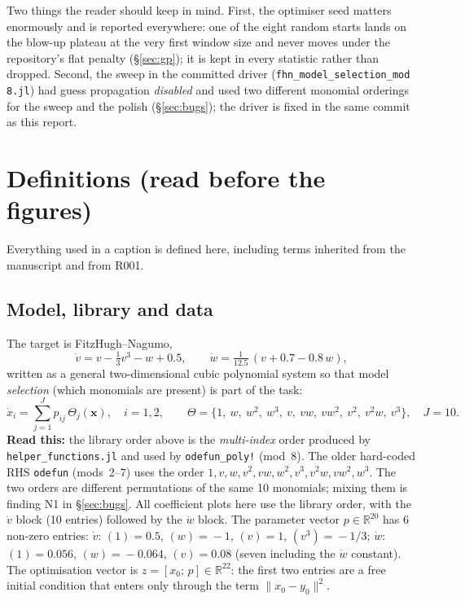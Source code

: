 \documentclass[10pt]{article}
\newcommand{\readthis}[1]{\textbf{Read this:} #1}
\begin{document}
Two things the reader should keep in mind. First, the optimiser seed matters enormously and is reported everywhere: one of the eight random starts lands on the blow-up plateau at the very first window size and never moves under the repository's flat penalty (\S\ref{sec:gp}); it is kept in every statistic rather than dropped. Second, the sweep in the committed driver (\texttt{fhn\_model\_selection\_mod 8.jl}) had guess propagation \emph{disabled} and used two different monomial orderings for the sweep and the polish (\S\ref{sec:bugs}); the driver is fixed in the same commit as this report.

\section{Definitions (read before the figures)}\label{sec:defs}
Everything used in a caption is defined here, including terms inherited from the manuscript and from R001.

\subsection{Model, library and data}
The target is FitzHugh--Nagumo,
\begin{equation}
\dot v = v - \tfrac{1}{3}v^3 - w + 0.5,\qquad \dot w = \tfrac{1}{12.5}\,(v + 0.7 - 0.8\,w),
\end{equation}
written as a general two-dimensional cubic polynomial system so that model \emph{selection} (which monomials are present) is part of the task:
\begin{equation}
\dot x_i = \sum_{j=1}^{J} p_{ij}\,\Theta_j(\mathbf x),\quad i=1,2,\qquad
\Theta = \{1,\ w,\ w^2,\ w^3,\ v,\ vw,\ vw^2,\ v^2,\ v^2 w,\ v^3\},\quad J=10 .
\end{equation}
\readthis{the library order above is the \emph{multi-index} order produced by \texttt{helper\_functions.jl} and used by \texttt{odefun\_poly!} (mod~8). The older hard-coded RHS \texttt{odefun} (mods~2--7) uses the order $1,v,w,v^2,vw,w^2,v^3,v^2w,vw^2,w^3$. The two orders are different permutations of the same 10 monomials; mixing them is finding N1 in \S\ref{sec:bugs}. All coefficient plots here use the library order, with the $\dot v$ block (10 entries) followed by the $\dot w$ block.} The parameter vector $p\in\mathbb R^{20}$ has 6 non-zero entries: $\dot v$: $(1)\!=\!0.5$, $(w)\!=\!-1$, $(v)\!=\!1$, $(v^3)\!=\!-1/3$; $\dot w$: $(1)\!=\!0.056$, $(w)\!=\!-0.064$, $(v)\!=\!0.08$ (seven including the $\dot w$ constant). The optimisation vector is $z=[x_0;\,p]\in\mathbb R^{22}$: the first two entries are a free initial condition that enters only through the term $\lVert x_0-y_0\rVert^2$.
\end{document}
